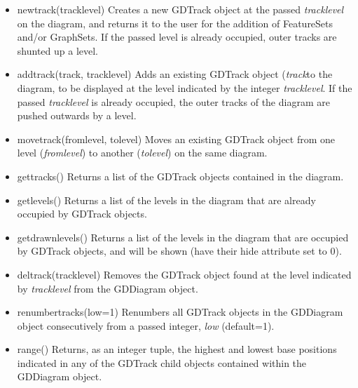 \documentclass{article}
\begin{document}
\begin{itemize}
\item {new\us track(track\us level)}
Creates a new GDTrack object at the passed \textit{track\us level} on the 
diagram, and returns it to the user for the addition of FeatureSets and/or 
GraphSets.  If the passed level is already occupied, outer tracks are shunted 
up a level.

\item {add\us track(track, track\us level)}
Adds an existing GDTrack object (\textit{track}to the diagram, to be 
displayed at the level indicated by the integer \textit{track\us level}. 
If the passed \textit{track\us level} is already occupied, the outer tracks 
of the diagram are pushed outwards by a level.

\item {move\us track(from\us level, to\us level)}
Moves an existing GDTrack object from one level (\textit{from\us level}) to 
another (\textit{to\us level}) on the same diagram.

\item {get\us tracks()}
Returns a list of the GDTrack objects contained in the diagram.

\item {get\us levels()}
Returns a list of the levels in the diagram that are already occupied by 
GDTrack objects.

\item {get\us drawn\us levels()}
Returns a list of the levels in the diagram that are occupied by GDTrack 
objects, and will be shown (have their hide attribute set to 0).

\item {del\us track(track\us level)}
Removes the GDTrack object found at the level indicated by 
\textit{track\us level} from the GDDiagram object.

\item {renumber\us tracks(low=1)}
Renumbers all GDTrack objects in the GDDiagram object consecutively from a 
passed integer, \textit{low} (default=1).

\item {range()}
Returns, as an integer tuple, the highest and lowest base positions indicated 
in any of the GDTrack child objects contained within the GDDiagram object.
\end{itemize}
\end{document}
